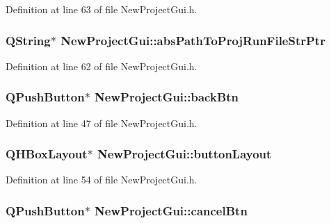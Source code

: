 Definition at line 63 of file New\-Project\-Gui.\-h.

\hypertarget{class_new_project_gui_ad8f25243a46ce10b6f1bc0c9ddb3e7eb}{
\subsubsection[{abs\-Path\-To\-Proj\-Run\-File\-Str\-Ptr}]{\setlength{\rightskip}{0pt plus 5cm}Q\-String$\ast$ New\-Project\-Gui\-::abs\-Path\-To\-Proj\-Run\-File\-Str\-Ptr\hspace{0.3cm}{\ttfamily [private]}}}\label{class_new_project_gui_ad8f25243a46ce10b6f1bc0c9ddb3e7eb}


Definition at line 62 of file New\-Project\-Gui.\-h.

\hypertarget{class_new_project_gui_a9dd8fc63be73f0aa6f7c61349dff95a2}{
\subsubsection[{back\-Btn}]{\setlength{\rightskip}{0pt plus 5cm}Q\-Push\-Button$\ast$ New\-Project\-Gui\-::back\-Btn\hspace{0.3cm}{\ttfamily [private]}}}\label{class_new_project_gui_a9dd8fc63be73f0aa6f7c61349dff95a2}


Definition at line 47 of file New\-Project\-Gui.\-h.

\hypertarget{class_new_project_gui_a7281efc1048f02fae1610c1fa0925473}{
\subsubsection[{button\-Layout}]{\setlength{\rightskip}{0pt plus 5cm}Q\-H\-Box\-Layout$\ast$ New\-Project\-Gui\-::button\-Layout\hspace{0.3cm}{\ttfamily [private]}}}\label{class_new_project_gui_a7281efc1048f02fae1610c1fa0925473}


Definition at line 54 of file New\-Project\-Gui.\-h.

\hypertarget{class_new_project_gui_a91a081ae496b19cd64dd33b292b1761e}{
\subsubsection[{cancel\-Btn}]{\setlength{\rightskip}{0pt plus 5cm}Q\-Push\-Button$\ast$ New\-Project\-Gui\-::cancel\-Btn\hspace{0.3cm}{\ttfamily [private]}}}\label{class_new_project_gui_a91a081ae496b19cd64dd33b292b1761e}


